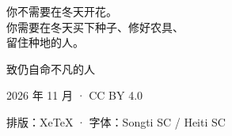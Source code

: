 \documentclass[11pt,openany,oneside]{ctexbook}
\begin{document}
\clearpage
\thispagestyle{empty}
\vspace*{52mm}
\begin{center}
{\songti\fontsize{13}{24}\selectfont 你不需要在冬天开花。\\[3mm]
你需要在冬天买下种子、修好农具、\\[3mm]
留住种地的人。\par}
\end{center}
\clearpage

\pagestyle{empty}
\setcounter{tocdepth}{0}
\tableofcontents

\mainmatter
\setlength{\parindent}{22pt}


\backmatter
\clearpage
\thispagestyle{empty}
\vspace*{\fill}
\begin{center}
{\heiti\small 致仍自命不凡的人\par}
\vspace{2mm}
{\songti\footnotesize\color{muted} 2026 年 11 月 · CC BY 4.0\par}
\vspace{2mm}
{\songti\footnotesize\color{muted} 排版：XeTeX · 字体：Songti SC / Heiti SC\par}
\end{center}
\vspace*{\fill}
\end{document}
